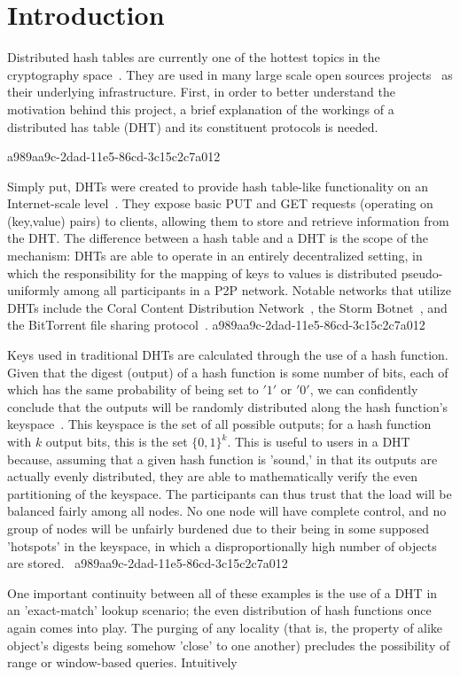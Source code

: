 \documentclass[12pt]{article}
\begin{document}
\section{Introduction}
\par Distributed hash tables are currently one of the hottest topics in the cryptography space~\cite{Stoica:2001dj,Rowstron:2001ea,Ratnasamy:2001wn}. They are used in many large scale open sources projects~\cite{Freitas:2013tb,Xu:2010vs,Perfitt:2010fh} as their underlying infrastructure. First, in order to better understand the motivation behind this project, a brief explanation of the workings of a distributed has table (DHT) and its constituent protocols is needed.

a989aa9c-2dad-11e5-86cd-3c15c2c7a012\par Simply put, DHTs were created to provide hash table-like functionality on an Internet-scale level~\cite{Ratnasamy:2001wn}. They expose basic PUT and GET requests (operating on (key,value) pairs) to clients, allowing them to store and retrieve information from the DHT. The difference between a hash table and a DHT is the scope of the mechanism: DHTs are able to operate in an entirely decentralized setting, in which the responsibility for the mapping of keys to values is distributed pseudo-uniformly among all participants in a P2P network. Notable networks that utilize DHTs include the Coral Content Distribution Network~\cite{Freedman:2004vb}, the Storm Botnet~\cite{Holz:2008uk}, and the BitTorrent file sharing protocol~\cite{Cohen:y1_8mBnw}.
a989aa9c-2dad-11e5-86cd-3c15c2c7a012
\par Keys used in traditional DHTs are calculated through the use of a hash function. Given that the digest (output) of a hash function is some number of bits, each of which has the same probability of being set to $'1'$ or $'0'$, we can confidently conclude that the outputs will be randomly distributed along the hash function's keyspace~. This keyspace is the set of all possible outputs; for a hash function with $k$ output bits, this is the set $\{0,1\}^k$. This is useful to users in a DHT because, assuming that a given hash function is 'sound,' in that its outputs are actually evenly distributed, they are able to mathematically verify the even partitioning of the keyspace. The participants can thus trust that the load will be balanced fairly among all nodes. No one node will have complete control, and no group of nodes will be unfairly burdened due to their being in some supposed 'hotspots' in the keyspace, in which a disproportionally high number of objects are stored.~
a989aa9c-2dad-11e5-86cd-3c15c2c7a012
\par One important continuity between all of these examples is the use of a DHT in an 'exact-match' lookup scenario; the even distribution of hash functions once again comes into play. The purging of any locality (that is, the property of alike object's digests being somehow 'close' to one another) precludes the possibility of range or window-based queries. Intuitively
\end{document}
